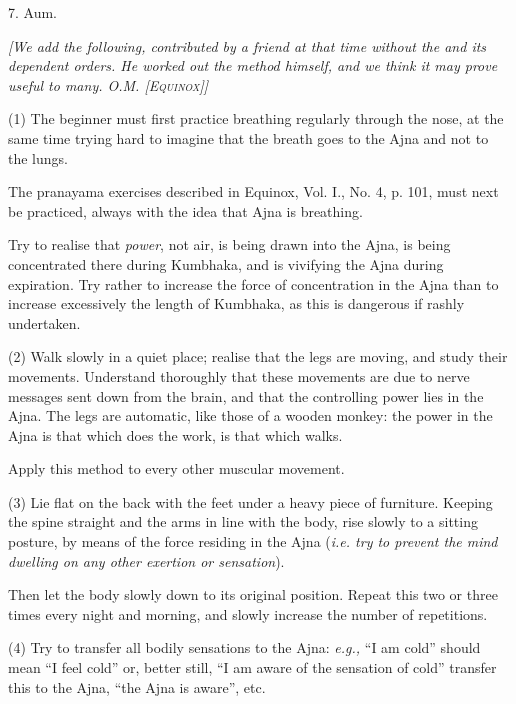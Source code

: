 7. Aum.


\textit{[We add the following, contributed by a friend at that time without the \Argentium{} and its dependent orders. He worked out the method himself, and we think it may prove useful to many. O.M. \textsc{[Equinox]}]}

(1) The beginner must first practice breathing regularly through the nose, at the same time trying hard to imagine that the breath goes to the Ajna and not to the lungs.

The pranayama exercises described in Equinox, Vol. I., No. 4, p. 101, must next be practiced, always with the idea that Ajna is breathing.

Try to realise that \textit{power}, not air, is being drawn into the Ajna, is being concentrated there during Kumbhaka, and is vivifying the Ajna during expiration. Try rather to increase the force of concentration in the Ajna than to increase excessively the length of Kumbhaka, as this is dangerous if rashly undertaken.

(2) Walk slowly in a quiet place; realise that the legs are moving, and study their movements. Understand thoroughly that these movements are due to nerve messages sent down from the brain, and that the controlling power lies in the Ajna. The legs are automatic, like those of a wooden monkey: the power in the Ajna is that which does the work, is that which walks.

Apply this method to every other muscular movement.

(3) Lie flat on the back with the feet under a heavy piece of furniture. Keeping the spine straight and the arms in line with the body, rise slowly to a sitting posture, by means of the force residing in the Ajna (\textit{i.e. try to prevent the mind dwelling on any other exertion or sensation}).

Then let the body slowly down to its original position. Repeat this two or three times every night and morning, and slowly increase the number of repetitions.

(4) Try to transfer all bodily sensations to the Ajna: \textit{e.g.,} \enquote{I am cold} should mean \enquote{I feel cold} or, better still, \enquote{I am aware of the sensation of cold} \textemdash{} transfer this to the Ajna, \enquote{the Ajna is aware}, etc.

